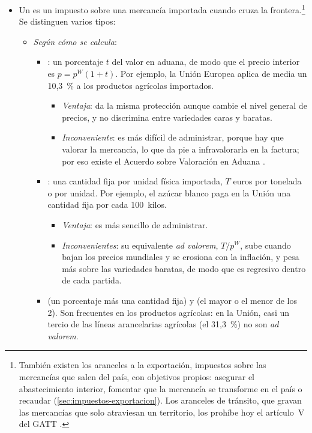 \documentclass[11pt]{article}
\begin{document}
\begin{itemize}
\item Un  es un impuesto sobre una mercancía importada cuando cruza la frontera.\footnote{También existen los aranceles a la exportación, impuestos sobre las mercancías que salen del país, con objetivos propios: asegurar el abastecimiento interior, fomentar que la mercancía se transforme en el país o recaudar (\ref{sec:impuestos-exportacion}). Los aranceles de tránsito, que gravan las mercancías que solo atraviesan un territorio, los prohíbe hoy el artículo~V del GATT\nocite{OMC1994GATT} .} Se distinguen varios tipos:
  \begin{itemize}
  \item \emph{Según cómo se calcula}:
    \begin{itemize}
    \item {}: un porcentaje $t$ del valor en aduana, de modo que el precio interior es $p=p^W(1+t)$. Por ejemplo, la Unión Europea aplica de media un 10,3~\% a los productos agrícolas importados\nocite{OMC2026PerfilesArancelarios}.
      \begin{itemize}
      \item \emph{Ventaja}: da la misma protección aunque cambie el nivel general de precios, y no discrimina entre variedades caras y baratas.
      \item \emph{Inconveniente}: es más difícil de administrar, porque hay que valorar la mercancía, lo que da pie a infravalorarla en la factura; por eso existe el Acuerdo sobre Valoración en Aduana .
      \end{itemize}
    \item {}: una cantidad fija por unidad física importada, $T$ euros por tonelada o por unidad. Por ejemplo, el azúcar blanco paga en la Unión una cantidad fija por cada 100~kilos.
      \begin{itemize}
      \item \emph{Ventaja}: es más sencillo de administrar.
      \item \emph{Inconvenientes}: su equivalente \emph{ad valorem}, $T/p^W$, sube cuando bajan los precios mundiales y se erosiona con la inflación, y pesa más sobre las variedades baratas, de modo que es regresivo dentro de cada partida.
      \end{itemize}
    \item {} (un porcentaje más una cantidad fija) y  (el mayor o el menor de los 2). Son frecuentes en los productos agrícolas: en la Unión, casi un tercio de las líneas arancelarias agrícolas (el 31,3~\%) no son \emph{ad valorem}\nocite{OMC2026PerfilesArancelarios}.

\end{itemize}
\end{itemize}
\end{itemize}
\end{document}
